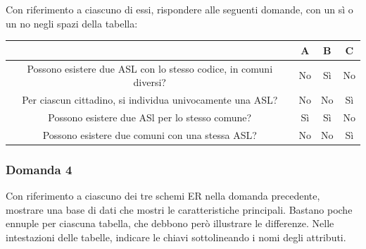 \documentclass{article}
\begin{document}
Con riferimento a ciascuno di essi, rispondere alle seguenti domande, con un sì o un no negli spazi
della tabella:

\begin{center}
    \begin{tabular}{|c|c|c|c|}
        \hline
        &A&B&C\\
        \hline
        Possono esistere due ASL con lo stesso codice, in comuni diversi?&No&Sì&No\\
        \hline
        Per ciascun cittadino, si individua univocamente una ASL?&No&No&Sì\\
        \hline
        Possono esistere due ASl per lo stesso comune?&Sì&Sì&No\\
        \hline
        Possono esistere due comuni con una stessa ASL?& No&No&Sì\\
        \hline        
    \end{tabular}
\end{center}

\subsubsection*{Domanda 4}

Con riferimento a ciascuno dei tre schemi ER nella domanda precedente, mostrare
una base di dati che mostri le caratteristiche principali. Bastano poche ennuple per ciascuna tabella,
che debbono però illustrare le differenze. Nelle intestazioni delle tabelle, indicare le chiavi sottolineando
i nomi degli attributi. 
\end{document}
